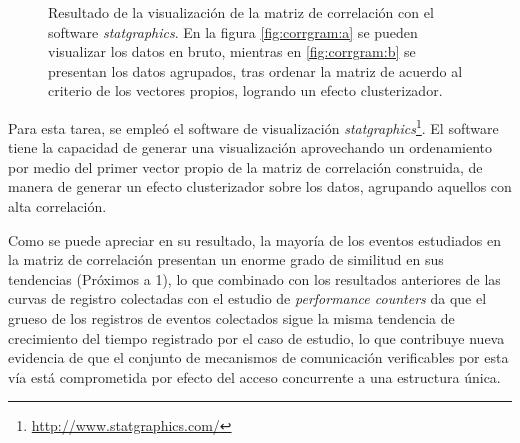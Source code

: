 \begin{figure}[h!]
	\centering
	\hspace*{\fill}
	\hfill
	\caption{Resultado de la visualización de la matriz de correlación con el software \emph{statgraphics}. En la figura \ref{fig:corrgram:a} se pueden visualizar los datos en bruto, mientras en \ref{fig:corrgram:b} se presentan los datos agrupados, tras ordenar la matriz de acuerdo al criterio de los vectores propios, logrando un efecto clusterizador.}
	\label{fig:corrmatrix}
	\hspace*{\fill}
\end{figure}


Para esta tarea, se empleó el software de visualización \emph{statgraphics}\footnote{\url{http://www.statgraphics.com/}}. El software tiene la capacidad de generar una visualización aprovechando un ordenamiento por medio del primer vector propio de la matriz de correlación construida, de manera de generar un efecto clusterizador sobre los datos, agrupando aquellos con alta correlación.

Como se puede apreciar en su resultado, la mayoría de los eventos estudiados en la matriz de correlación presentan un enorme grado de similitud en sus tendencias (Próximos a 1), lo que combinado con los resultados anteriores de las curvas de registro colectadas con el estudio de \emph{performance counters} da que el grueso de los registros de eventos colectados sigue la misma tendencia de crecimiento del tiempo registrado por el caso de estudio, lo que contribuye nueva evidencia de que el conjunto de mecanismos de comunicación verificables por esta vía está comprometida por efecto del acceso concurrente a una estructura única.

